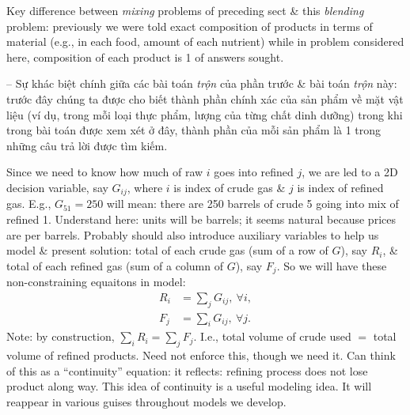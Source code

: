 \documentclass{article}
\begin{document}
\begin{itemize}
\begin{itemize}
\begin{itemize}
            Key difference between {\it mixing} problems of preceding sect \& this {\it blending} problem: previously we were told exact composition of products in terms of material (e.g., in each food, amount of each nutrient) while in problem considered here, composition of each product is 1 of answers sought.

            -- Sự khác biệt chính giữa các bài toán {\it trộn} của phần trước \& bài toán {\it trộn} này: trước đây chúng ta được cho biết thành phần chính xác của sản phẩm về mặt vật liệu (ví dụ, trong mỗi loại thực phẩm, lượng của từng chất dinh dưỡng) trong khi trong bài toán được xem xét ở đây, thành phần của mỗi sản phẩm là 1 trong những câu trả lời được tìm kiếm.

            Since we need to know how much of raw $i$ goes into refined $j$, we are led to a 2D decision variable, say $G_{ij}$, where $i$ is index of crude gas \& $j$ is index of refined gas. E.g., $G_{51} = 250$ will mean: there are 250 barrels of crude 5 going into mix of refined 1. Understand here: units will be barrels; it seems natural because prices are per barrels. Probably should also introduce auxiliary variables to help us model \& present solution: total of each crude gas (sum of a row of $G$), say $R_i$, \& total of each refined gas (sum of a column of $G$), say $F_j$. So we will have these non-constraining equaitons in model:
            \begin{align*}
                R_i &= \sum_j G_{ij},\ \forall i,\\
                F_j &= \sum_i G_{ij},\ \forall j.
            \end{align*}
            Note: by construction, $\sum_i R_i = \sum_j F_j$. I.e., total volume of crude used $=$ total volume of refined products. Need not enforce this, though we need it. Can think of this as a ``continuity'' equation: it reflects: refining process does not lose product along way. This idea of continuity is a useful modeling idea. It will reappear in various guises throughout models we develop.


\end{itemize}
\end{itemize}
\end{itemize}
\end{document}
